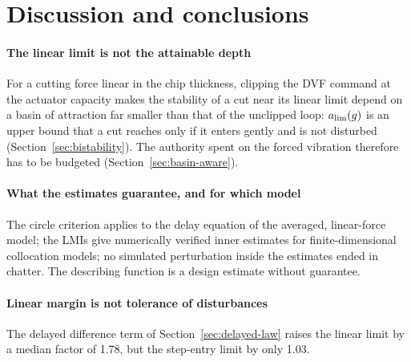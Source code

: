 \section{Discussion and conclusions}\label{sec:discussion}

\paragraph{The linear limit is not the attainable depth}
For a cutting force linear in the chip thickness, clipping the DVF command at the actuator capacity makes the stability of a cut near its linear limit depend on a basin of attraction far smaller than that of the unclipped loop: $a_{\lim}(g)$ is an upper bound that a cut reaches only if it enters gently and is not disturbed (Section~\ref{sec:bistability}). The authority spent on the forced vibration therefore has to be budgeted (Section~\ref{sec:basin-aware}).

\paragraph{What the estimates guarantee, and for which model}
The circle criterion applies to the delay equation of the averaged, linear-force model; the LMIs give numerically verified inner estimates for finite-dimensional collocation models; no simulated perturbation inside the estimates ended in chatter. The describing function is a design estimate without guarantee.

\paragraph{Linear margin is not tolerance of disturbances}
The delayed difference term of Section~\ref{sec:delayed-law} raises the linear limit by a median factor of 1.78, but the step-entry limit by only 1.03.

